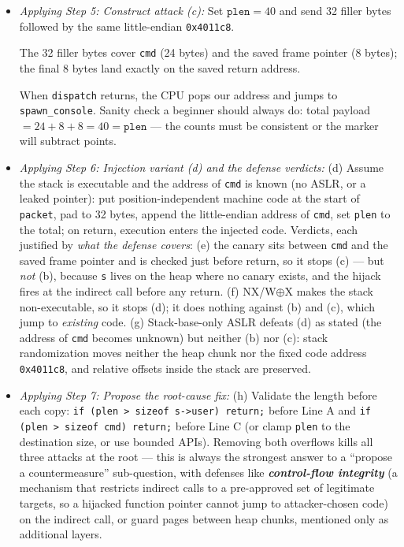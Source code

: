 \documentclass[12pt, a4paper]{article}
\newcommand{\term}[1]{\textbf{\textit{#1}}}        %
\begin{document}
\begin{itemize}
    The first 16 bytes exactly fill \texttt{user}; the next 8 overwrite \texttt{on\_done}; Line B then executes \texttt{spawn\_console()}.

    Two beginner mistakes to avoid: writing the address in big-endian order (x86 is little-endian --- least significant byte first), and worrying about the five NUL bytes in the address --- \texttt{memcpy} does not stop at \texttt{0x00}, so they are delivered fine (a string-based copy would truncate this payload).
    \item \textit{Applying Step 5: Construct attack (c):} Set $\texttt{plen} = 40$ and send 32 filler bytes followed by the same little-endian \texttt{0x4011c8}.

    The 32 filler bytes cover \texttt{cmd} (24 bytes) and the saved frame pointer (8 bytes); the final 8 bytes land exactly on the saved return address.

    When \texttt{dispatch} returns, the CPU pops our address and jumps to \texttt{spawn\_console}. Sanity check a beginner should always do: total payload $= 24 + 8 + 8 = 40 = \texttt{plen}$ --- the counts must be consistent or the marker will subtract points.
    \item \textit{Applying Step 6: Injection variant (d) and the defense verdicts:} (d) Assume the stack is executable and the address of \texttt{cmd} is known (no ASLR, or a leaked pointer): put position-independent machine code at the start of \texttt{packet}, pad to 32 bytes, append the little-endian address of \texttt{cmd}, set \texttt{plen} to the total;
    on return, execution enters the injected code. Verdicts, each justified by \emph{what the defense covers}: (e) the canary sits between \texttt{cmd} and the saved frame pointer and is checked just before return, so it stops (c) --- but \emph{not} (b), because \texttt{s} lives on the heap where no canary exists, and the hijack fires at the indirect call before any return. (f) NX/W$\oplus$X makes the stack non-executable, so it stops (d);
    it does nothing against (b) and (c), which jump to \emph{existing} code. (g) Stack-base-only ASLR defeats (d) as stated (the address of \texttt{cmd} becomes unknown) but neither (b) nor (c): stack randomization moves neither the heap chunk nor the fixed code address \texttt{0x4011c8}, and relative offsets inside the stack are preserved.
    \item \textit{Applying Step 7: Propose the root-cause fix:} (h) Validate the length before each copy: \texttt{if (plen > sizeof s->user) return;} before Line A and \texttt{if (plen > sizeof cmd) return;} before Line C (or clamp \texttt{plen} to the destination size, or use bounded APIs).
    Removing both overflows kills all three attacks at the root --- this is always the strongest answer to a ``propose a countermeasure'' sub-question, with defenses like \term{control-flow integrity} (a mechanism that restricts indirect calls to a pre-approved set of legitimate targets, so a hijacked function pointer cannot jump to attacker-chosen code) on the indirect call, or guard pages between heap chunks, mentioned only as additional layers.
\end{itemize}
\end{document}
